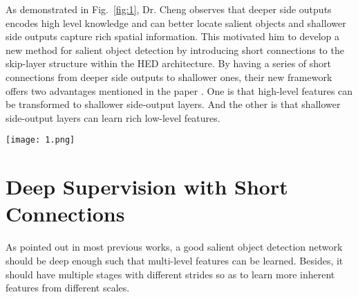 \documentclass[10pt,twocolumn,letterpaper]{article}
\begin{document}
As demonstrated in Fig.~\ref{fig:1}, Dr. Cheng observes that deeper side outputs encodes high level knowledge and can better locate salient objects and shallower side outputs capture rich spatial information. This motivated him to develop a new method for salient object detection by introducing short connections to the skip-layer structure within the HED architecture. By having a series of short connections from deeper side outputs to shallower ones, their new framework offers two advantages mentioned in the paper \cite{Hou2016Deeply}. One is that high-level features can be transformed to shallower side-output layers. And the other is that shallower side-output layers can learn rich low-level features.
\begin{figure*}
	\begin{center}
		\texttt{[image: 1.png]}
	\end{center}
	\caption{Visual comparison of saliency maps produced by the HED-based method and theirs. Though saliency maps produced by deeper side output look similar, because of the introduced short connections, each shallower side output can generate satisfactory saliency maps and hence a better output result.}
	\label{fig:1}
\end{figure*}

\section{Deep Supervision with Short Connections}

As pointed out in most previous works, a good salient object detection network should be deep enough such that multi-level features can be learned. Besides, it should have multiple stages with different strides so as to learn more inherent features from different scales.
\end{document}
